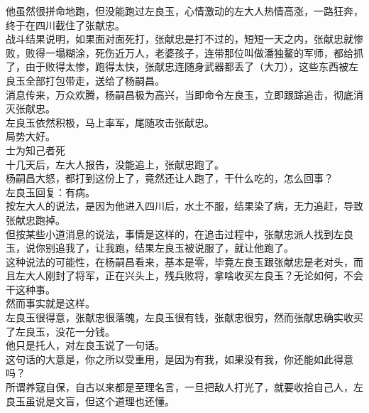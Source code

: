 \begin{multicols}{\theparacolNo}
他虽然很拼命地跑，但没能跑过左良玉，心情激动的左大人热情高涨，一路狂奔，终于在四川截住了张献忠。\\

战斗结果说明，如果面对面死打，张献忠是打不过的，短短一天之内，张献忠就惨败，败得一塌糊涂，死伤近万人，老婆孩子，连带那位叫做潘独鳌的军师，都给抓了，由于败得太惨，跑得太快，张献忠连随身武器都丢了（大刀），这些东西被左良玉全部打包带走，送给了杨嗣昌。\\

消息传来，万众欢腾，杨嗣昌极为高兴，当即命令左良玉，立即跟踪追击，彻底消灭张献忠。\\

左良玉依然积极，马上率军，尾随攻击张献忠。\\

局势大好。\\

士为知己者死\\

十几天后，左大人报告，没能追上，张献忠跑了。\\

杨嗣昌大怒，都打到这份上了，竟然还让人跑了，干什么吃的，怎么回事？\\

左良玉回复：有病。\\

按左大人的说法，是因为他进入四川后，水土不服，结果染了病，无力追赶，导致张献忠跑掉。\\

但按某些小道消息的说法，事情是这样的，在追击过程中，张献忠派人找到左良玉，说你别追我了，让我跑，结果左良玉被说服了，就让他跑了。\\

这种说法的可能性，在杨嗣昌看来，基本是零，毕竟左良玉跟张献忠是老对头，而且左大人刚封了将军，正在兴头上，残兵败将，拿啥收买左良玉？无论如何，不会干这种事。\\

然而事实就是这样。\\

左良玉很得意，张献忠很落魄，左良玉很有钱，张献忠很穷，然而张献忠确实收买了左良玉，没花一分钱。\\

他只是托人，对左良玉说了一句话。\\

这句话的大意是，你之所以受重用，是因为有我，如果没有我，你还能如此得意吗？\\

所谓养寇自保，自古以来都是至理名言，一旦把敌人打光了，就要收拾自己人，左良玉虽说是文盲，但这个道理也还懂。\\


\end{multicols}
